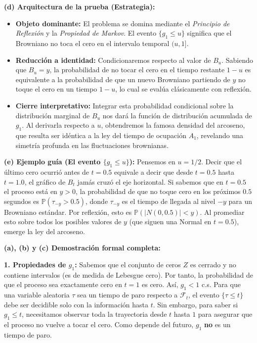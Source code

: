 \documentclass[11pt, letterpaper]{article}
\begin{document}
\begin{solucion}
    \textbf{(d) Arquitectura de la prueba (Estrategia):}
    \begin{itemize}
        \item[(i)] \textbf{Objeto dominante:} El problema se domina mediante el \textit{Principio de Reflexión} y la \textit{Propiedad de Markov}. El evento $\{g_1 \le u\}$ significa que el Browniano no toca el cero en el intervalo temporal $(u, 1]$.
        \item[(ii)] \textbf{Reducción a identidad:} Condicionaremos respecto al valor de $B_u$. Sabiendo que $B_u = y$, la probabilidad de no tocar el cero en el tiempo restante $1-u$ es equivalente a la probabilidad de que un nuevo Browniano partiendo de $y$ no toque el cero en un tiempo $1-u$, lo cual se evalúa clásicamente con reflexión.
        \item[(iii)] \textbf{Cierre interpretativo:} Integrar esta probabilidad condicional sobre la distribución marginal de $B_u$ nos dará la función de distribución acumulada de $g_1$. Al derivarla respecto a $u$, obtendremos la famosa densidad del arcoseno, que resulta ser idéntica a la ley del tiempo de ocupación $A_1$, revelando una simetría profunda en las fluctuaciones brownianas.
    \end{itemize}

    \vspace{3mm}
    \textbf{(e) Ejemplo guía (El evento $\{g_1 \le u\}$):}
    Pensemos en $u = 1/2$. Decir que el último cero ocurrió antes de $t=0.5$ equivale a decir que desde $t=0.5$ hasta $t=1.0$, el gráfico de $B_t$ jamás cruzó el eje horizontal. 
    Si sabemos que en $t=0.5$ el proceso está en $y > 0$, la probabilidad de que no toque cero en los próximos $0.5$ segundos es $\mathbb{P}(\tau_{-y} > 0.5)$, donde $\tau_{-y}$ es el tiempo de llegada al nivel $-y$ para un Browniano estándar. Por reflexión, esto es $\mathbb{P}(|N(0, 0.5)| < y)$. Al promediar esto sobre todos los posibles valores de $y$ (que siguen una Normal en $t=0.5$), emerge la ley del arcoseno.

    \vspace{3mm}
    \textbf{(a), (b) y (c) Demostración formal completa:}

    \textbf{1. Propiedades de $g_1$:}
    Sabemos que el conjunto de ceros $Z$ es cerrado y no contiene intervalos (es de medida de Lebesgue cero). Por tanto, la probabilidad de que el proceso sea exactamente cero en $t=1$ es cero. Así, $g_1 < 1$ c.s. 
    Para que una variable aleatoria $\tau$ sea un tiempo de paro respecto a $\mathcal{F}_t$, el evento $\{\tau \le t\}$ debe ser decidible solo con la información hasta $t$. Sin embargo, para saber si $g_1 \le t$, necesitamos observar toda la trayectoria desde $t$ hasta $1$ para asegurar que el proceso no vuelve a tocar el cero. Como depende del futuro, $g_1$ \textbf{no} es un tiempo de paro.


\end{solucion}
\end{document}
